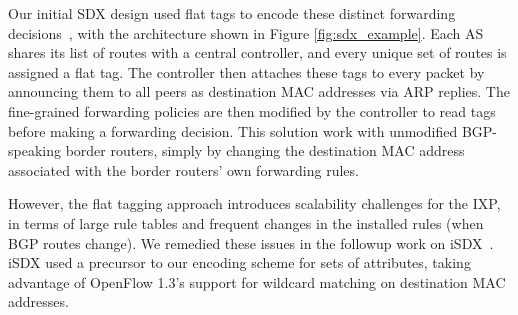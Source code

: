 Our initial SDX design used flat tags to encode these distinct
forwarding decisions~\cite{sdx}, with the architecture shown in Figure
\ref{fig:sdx_example}. Each AS shares its list of routes with a
central controller, and every unique set of routes is assigned a flat
tag. The controller then attaches these tags to every packet by
announcing them to all peers as destination MAC addresses via ARP
replies. The fine-grained forwarding policies are then modified by the
controller to read tags before making a forwarding decision.  This
solution work with unmodified BGP-speaking border routers, simply by
changing the destination MAC address associated with the border
routers' own forwarding rules.  

However, the flat tagging approach introduces scalability challenges
for the IXP, in terms of large rule tables and frequent changes in the
installed rules (when BGP routes change).  We remedied these issues in
the followup work on iSDX~\cite{isdx}. iSDX used a precursor to our
encoding scheme for sets of attributes, taking advantage of OpenFlow
1.3's support for wildcard matching on destination MAC addresses.


